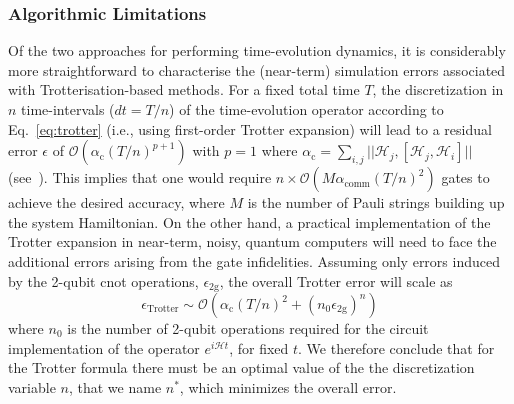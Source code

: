\subsubsection{Algorithmic Limitations\label{subsubsec:limitsQD}}  
Of the two approaches for performing time-evolution dynamics, it is considerably more straightforward to characterise the (near-term) simulation errors associated with Trotterisation-based methods.
For a fixed total time $T$, the discretization in $n$ time-intervals ($dt=T/n$) of the time-evolution operator according to Eq.~\eqref{eq:trotter} (i.e., using first-order Trotter expansion) will lead to a residual error $\epsilon$ of $\mathcal{O}(\alpha_{\text{c}} (T/n)^{p+1})$ with $p=1$ where $\alpha_{\text{c}}=\sum_{i,j} || \mathcal{H}_j,[\mathcal{H}_j,\mathcal{H}_i]||$ (see~\cite{PhysRevX.11.011020}). 
This implies that one would require $n \times \mathcal{O}(M \alpha_{\text{comm}} (T/n)^{2})$ gates to achieve the desired accuracy, where $M$ is the number of Pauli strings building up the system Hamiltonian.
On the other hand, a practical implementation of the Trotter expansion in near-term, noisy, quantum computers will need to face the additional errors arising from the gate infidelities. Assuming only errors induced by the 2-qubit \gls{cnot} operations, $\epsilon_{\text{2g}}$, the overall Trotter error will scale as
\begin{equation}
    \epsilon_{\text{Trotter}} \sim \mathcal{O} (\alpha_{\text{c}} (T/n)^{2} + (n_0 \epsilon_{\text{2g}})^n )
\end{equation}
where $n_0$ is the number of 2-qubit operations required for the circuit implementation of the operator $e^{i \mathcal{H} t}$, for fixed $t$.
We therefore conclude that for the Trotter formula there must be an optimal value of the the discretization variable $n$, that we name $n^*$, which minimizes the overall error.

